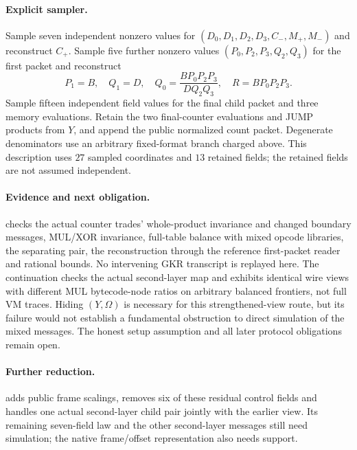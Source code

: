 \paragraph{Explicit sampler.} Sample seven independent nonzero values for $(D_0,D_1,D_2,D_3,C_-,M_+,M_-)$ and reconstruct $C_+$. Sample five further nonzero values $(P_0,P_2,P_3,Q_2,Q_3)$ for the first packet and reconstruct
\[
 P_1=B,\quad Q_1=D,\quad
 Q_0=\frac{BP_0P_2P_3}{DQ_2Q_3},\quad R=BP_0P_2P_3.
\]
Sample fifteen independent field values for the final child packet and three memory evaluations. Retain the two final-counter evaluations and JUMP products from $Y$, and append the public normalized count packet. Degenerate denominators use an arbitrary fixed-format branch charged above. This description uses $27$ sampled coordinates and $13$ retained fields; the retained fields are not assumed independent.

\paragraph{Evidence and next obligation.}  checks the actual counter trades' whole-product invariance and changed boundary messages, MUL/XOR invariance, full-table balance with mixed opcode libraries, the separating pair, the reconstruction through the reference first-packet reader and rational bounds. No intervening GKR transcript is replayed here. The continuation  checks the actual second-layer map and exhibits identical wire views with different MUL bytecode-node ratios on arbitrary balanced frontiers, not full VM traces. Hiding $(Y,\Omega)$ is necessary for this strengthened-view route, but its failure would not establish a fundamental obstruction to direct simulation of the mixed messages. The honest setup assumption and all later protocol obligations remain open.

\paragraph{Further reduction.}  adds public frame scalings, removes six of these residual control fields and handles one actual second-layer child pair jointly with the earlier view. Its remaining seven-field law and the other second-layer messages still need simulation; the native frame/offset representation also needs support.
